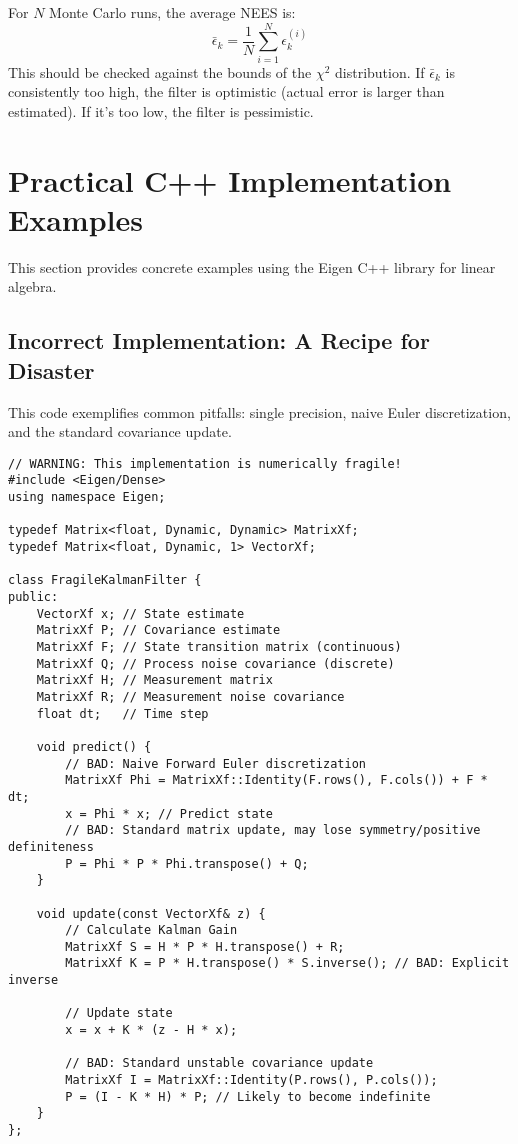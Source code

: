 \documentclass[11pt]{article}
\begin{document}
For $N$ Monte Carlo runs, the average NEES is:
\begin{equation}
\bar{\epsilon}_k = \frac{1}{N} \sum_{i=1}^{N} \epsilon_k^{(i)}
\end{equation}
This should be checked against the bounds of the $\chi^2$ distribution. If $\bar{\epsilon}_k$ is consistently too high, the filter is optimistic (actual error is larger than estimated). If it's too low, the filter is pessimistic.

\section{Practical C++ Implementation Examples}
\label{sec:implementation}
This section provides concrete examples using the Eigen C++ library for linear algebra.

\subsection{Incorrect Implementation: A Recipe for Disaster}
This code exemplifies common pitfalls: single precision, naive Euler discretization, and the standard covariance update.
\begin{lstlisting}[caption=Fragile Kalman Filter Implementation]
// WARNING: This implementation is numerically fragile!
#include <Eigen/Dense>
using namespace Eigen;

typedef Matrix<float, Dynamic, Dynamic> MatrixXf;
typedef Matrix<float, Dynamic, 1> VectorXf;

class FragileKalmanFilter {
public:
    VectorXf x; // State estimate
    MatrixXf P; // Covariance estimate
    MatrixXf F; // State transition matrix (continuous)
    MatrixXf Q; // Process noise covariance (discrete)
    MatrixXf H; // Measurement matrix
    MatrixXf R; // Measurement noise covariance
    float dt;   // Time step

    void predict() {
        // BAD: Naive Forward Euler discretization
        MatrixXf Phi = MatrixXf::Identity(F.rows(), F.cols()) + F * dt;
        x = Phi * x; // Predict state
        // BAD: Standard matrix update, may lose symmetry/positive definiteness
        P = Phi * P * Phi.transpose() + Q;
    }

    void update(const VectorXf& z) {
        // Calculate Kalman Gain
        MatrixXf S = H * P * H.transpose() + R;
        MatrixXf K = P * H.transpose() * S.inverse(); // BAD: Explicit inverse

        // Update state
        x = x + K * (z - H * x);

        // BAD: Standard unstable covariance update
        MatrixXf I = MatrixXf::Identity(P.rows(), P.cols());
        P = (I - K * H) * P; // Likely to become indefinite
    }
};
\end{lstlisting}
\end{document}

